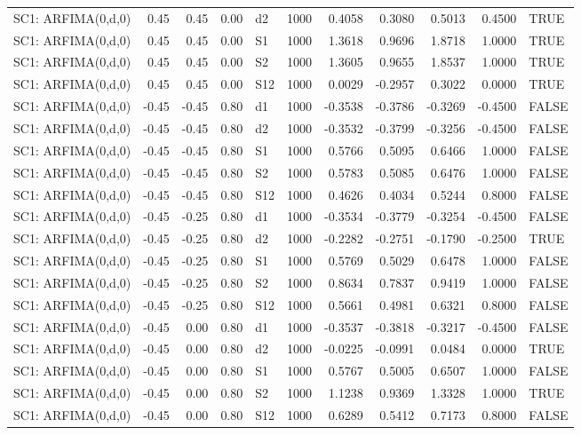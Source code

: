 \begin{table}[ht]
\begin{tabular}{lrrrlrrrrrl}
  SC1: ARFIMA(0,d,0) & 0.45 & 0.45 & 0.00 & d2 & 1000 & 0.4058 & 0.3080 & 0.5013 & 0.4500 & TRUE \\ 
  SC1: ARFIMA(0,d,0) & 0.45 & 0.45 & 0.00 & S1 & 1000 & 1.3618 & 0.9696 & 1.8718 & 1.0000 & TRUE \\ 
  SC1: ARFIMA(0,d,0) & 0.45 & 0.45 & 0.00 & S2 & 1000 & 1.3605 & 0.9655 & 1.8537 & 1.0000 & TRUE \\ 
  SC1: ARFIMA(0,d,0) & 0.45 & 0.45 & 0.00 & S12 & 1000 & 0.0029 & -0.2957 & 0.3022 & 0.0000 & TRUE \\ 
  SC1: ARFIMA(0,d,0) & -0.45 & -0.45 & 0.80 & d1 & 1000 & -0.3538 & -0.3786 & -0.3269 & -0.4500 & FALSE \\ 
  SC1: ARFIMA(0,d,0) & -0.45 & -0.45 & 0.80 & d2 & 1000 & -0.3532 & -0.3799 & -0.3256 & -0.4500 & FALSE \\ 
  SC1: ARFIMA(0,d,0) & -0.45 & -0.45 & 0.80 & S1 & 1000 & 0.5766 & 0.5095 & 0.6466 & 1.0000 & FALSE \\ 
  SC1: ARFIMA(0,d,0) & -0.45 & -0.45 & 0.80 & S2 & 1000 & 0.5783 & 0.5085 & 0.6476 & 1.0000 & FALSE \\ 
  SC1: ARFIMA(0,d,0) & -0.45 & -0.45 & 0.80 & S12 & 1000 & 0.4626 & 0.4034 & 0.5244 & 0.8000 & FALSE \\ 
  SC1: ARFIMA(0,d,0) & -0.45 & -0.25 & 0.80 & d1 & 1000 & -0.3534 & -0.3779 & -0.3254 & -0.4500 & FALSE \\ 
  SC1: ARFIMA(0,d,0) & -0.45 & -0.25 & 0.80 & d2 & 1000 & -0.2282 & -0.2751 & -0.1790 & -0.2500 & TRUE \\ 
  SC1: ARFIMA(0,d,0) & -0.45 & -0.25 & 0.80 & S1 & 1000 & 0.5769 & 0.5029 & 0.6478 & 1.0000 & FALSE \\ 
  SC1: ARFIMA(0,d,0) & -0.45 & -0.25 & 0.80 & S2 & 1000 & 0.8634 & 0.7837 & 0.9419 & 1.0000 & FALSE \\ 
  SC1: ARFIMA(0,d,0) & -0.45 & -0.25 & 0.80 & S12 & 1000 & 0.5661 & 0.4981 & 0.6321 & 0.8000 & FALSE \\ 
  SC1: ARFIMA(0,d,0) & -0.45 & 0.00 & 0.80 & d1 & 1000 & -0.3537 & -0.3818 & -0.3217 & -0.4500 & FALSE \\ 
  SC1: ARFIMA(0,d,0) & -0.45 & 0.00 & 0.80 & d2 & 1000 & -0.0225 & -0.0991 & 0.0484 & 0.0000 & TRUE \\ 
  SC1: ARFIMA(0,d,0) & -0.45 & 0.00 & 0.80 & S1 & 1000 & 0.5767 & 0.5005 & 0.6507 & 1.0000 & FALSE \\ 
  SC1: ARFIMA(0,d,0) & -0.45 & 0.00 & 0.80 & S2 & 1000 & 1.1238 & 0.9369 & 1.3328 & 1.0000 & TRUE \\ 
  SC1: ARFIMA(0,d,0) & -0.45 & 0.00 & 0.80 & S12 & 1000 & 0.6289 & 0.5412 & 0.7173 & 0.8000 & FALSE \\ 

\end{tabular}
\end{table}
